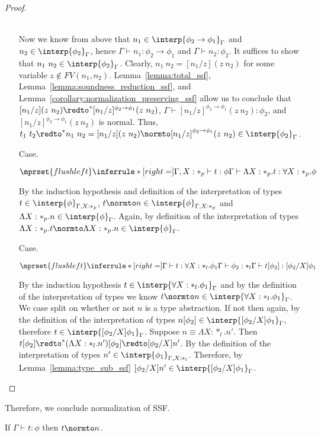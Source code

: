 \begin{proof}
\begin{itemize}
  \ \\
  Now we know from above that $n_1 \in \interp{\phi_2 \rightarrow \phi_1}_\Gamma$ and
  $n_2 \in \interp{\phi_2}_\Gamma$, hence $\Gamma \vdash n_1:\phi_2 \to \phi_1$ and
  $\Gamma \vdash n_2:\phi_2$.  It suffices to show that $n_1\ n_2 \in \interp{\phi_2}_\Gamma$.
  Clearly, $n_1\ n_2 = [n_1/z](z\ n_2)$ for some variable $z \not \in FV(n_1,n_2)$.  
  Lemma~\ref{lemma:total_ssf}, Lemma~\ref{lemma:soundness_reduction_ssf}, 
  and Lemma~\ref{corollary:normalization_preserving_ssf} allow us to conclude that 
  $[n_1/z](z\ n_2) \redto^* [n_1/z]^{\phi_2 \to \phi_1}(z\ n_2)$, $\Gamma \vdash [n_1/z]^{\phi_2 \to \phi_1}(z\ n_2):\phi_2$,
  and $[n_1/z]^{\phi_2 \to \phi_1}(z\ n_2)$ is normal.  Thus, 
  $t_1\ t_2 \redto^* n_1\ n_2 = [n_1/z](z\ n_2) \normto [n_1/z]^{\phi_2 \to \phi_1}(z\ n_2) \in \interp{\phi_2}_\Gamma$.
  
\item[Case.]\ \\
  \begin{center}
    \begin{math}
      $$\mprset{flushleft}
      \inferrule* [right=] {
        \Gamma, X : *_p \vdash t : \phi
      }{\Gamma \vdash \Lambda X:*_p.t:\forall X:*_p.\phi}
    \end{math}
  \end{center}
  By the induction hypothesis and definition of the interpretation of types 
  $t \in \interp{\phi}_{\Gamma,X:*_p}$, $t \normto n \in \interp{\phi}_{\Gamma,X:*_p}$ and 
  $\Lambda X:*_p.n \in \interp{\phi}_{\Gamma}$.  Again, by definition of the interpretation 
  of types $\Lambda X:*_p.t \normto \Lambda X:*_p.n \in \interp{\phi}_{\Gamma}$.

\item[Case.]\ \\
  \begin{center}
    \begin{math}
      $$\mprset{flushleft}
      \inferrule* [right=] {
        \Gamma \vdash t:\forall X:*_l.\phi_1
        \\
        \Gamma \vdash \phi_2:*_l
      }{\Gamma \vdash t[\phi_2]: [\phi_2/X]\phi_1}
    \end{math}
  \end{center}
  By the induction hypothesis $t \in \interp{\forall X:*_l.\phi_1}_\Gamma$ and by the 
  definition of the interpretation of types we know 
  $t \normto n \in \interp{\forall X:*_l.\phi_1}_\Gamma$.  We case
  split on whether or not $n$ is a type abstraction. If not then again, by the 
  definition of the interpretation of types 
  $n[\phi_2] \in \interp{[\phi_2/X]\phi_1}_\Gamma$, therefore 
  $t \in \interp{[\phi_2/X]\phi_1}_\Gamma$.  Suppose $n \equiv \Lambda X:*_l.n'$.  Then 
  $t[\phi_2] \redto^* (\Lambda X:*_l.n')[\phi_2] \redto [\phi_2/X]n'$.  By the definition 
  of the interpretation of types $n' \in \interp{\phi_1}_{\Gamma,X:*_l}$. Therefore, by
  Lemma~\ref{lemma:type_sub_ssf} $[\phi_2/X]n' \in \interp{[\phi_2/X]\phi_1}_{\Gamma}$.
\end{itemize}
\end{proof}
\noindent Therefore, we conclude normalization of SSF.
\begin{corollary}[Normalization]
  If $\Gamma \vdash t:\phi$ then $t \normto n$.
\end{corollary}


